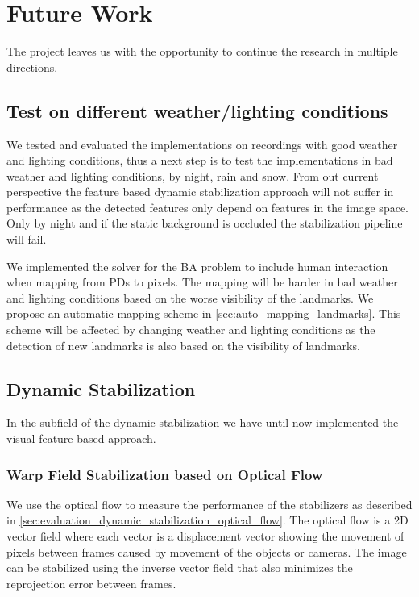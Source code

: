 
\section{Future Work}
The project leaves us with the opportunity to continue the research in multiple directions.

\subsection{Test on different weather/lighting conditions}
We tested and evaluated the implementations on recordings with good weather and lighting conditions, thus a next step is to test the implementations in bad weather and lighting conditions, \eg by night, rain and snow.
From out current perspective the feature based dynamic stabilization approach will not suffer in performance as the detected features only depend on features in the image space. 
Only by night and if the static background is occluded the stabilization pipeline will fail.

We implemented the solver for the BA problem to include human interaction when mapping from PDs to pixels.
The mapping will be harder in bad weather and lighting conditions based on the worse visibility of the landmarks.
We propose an automatic mapping scheme in \autoref{sec:auto_mapping_landmarks}.
This scheme will be affected by changing weather and lighting conditions as the detection of new landmarks is also based on the visibility of landmarks.


\subsection{Dynamic Stabilization}
In the subfield of the dynamic stabilization we have until now implemented the visual feature based approach.

\subsubsection{Warp Field Stabilization based on Optical Flow}
We use the optical flow to measure the performance of the stabilizers as described in  \autoref{sec:evaluation_dynamic_stabilization_optical_flow}.
The optical flow is a 2D vector field where each vector is a displacement vector showing the movement of pixels between frames caused by movement of the objects or cameras.
The image can be stabilized using the inverse vector field that also minimizes the reprojection error between frames.

